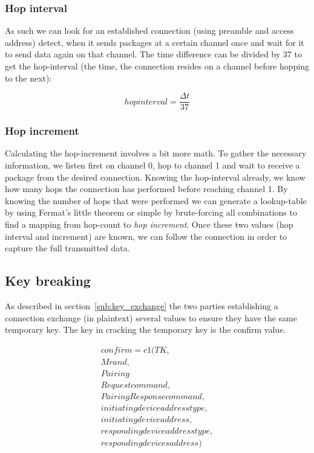 \documentclass[conference]{IEEEtran}
\begin{document}
\subsubsection{Hop interval}
\label{ssub:hop_interval}

As such we can look for an established connection (using preamble and access address) detect, when it sends packages at a certain channel once and wait for it to send data again on that channel. The time difference can be divided by 37 to get the hop-interval (the time, the connection resides on a channel before hopping to the next):

\begin{equation*}
  hopinterval = \frac{\Delta t}{37}
\end{equation*}

\subsubsection{Hop increment}
\label{ssub:hop_increment}

Calculating the hop-increment involves a bit more math. To gather the necessary 
information, we listen first on channel 0, hop to channel 1 and wait to receive 
a package from the desired connection. Knowing the hop-interval already, we 
know how many hops the connection has performed before reaching channel 1. By 
knowing the number of hops that were performed we can generate a lookup-table 
by using Fermat’s little theorem or simple by brute-forcing all combinations to 
find a mapping from hop-count to \emph{hop increment}. Once these two values 
(hop interval and increment) are known, we can follow the connection in order 
to capture the full transmitted data.

\subsection{Key breaking}

As described in section~\ref{sub:key_exchange} the two parties establishing a 
connection exchange (in plaintext) several values to ensure they have the same 
temporary key. The key in cracking the temporary key is the confirm value.

\begin{equation*}
  \begin{split}
  confirm = c1 ( TK , \\Mrand , \\Pairing \\Request command, \\Pairing Response command, \\initiating device address type, \\initiating device address, \\responding device address type, \\responding devices address)
  \end{split}
\end{equation*}
\end{document}

